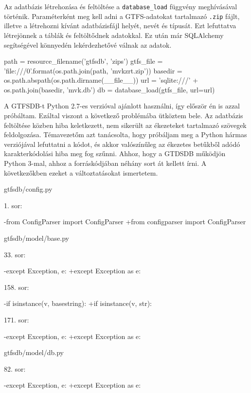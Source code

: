 Az adatbázis létrehozása és feltöltése a \texttt{database\_load} függvény meghívásával történik. Paraméterként meg kell adni a GTFS-adatokat tartalmazó \texttt{.zip} fájlt, illetve a létrehozni kívánt adatbázisfájl helyét, nevét és típusát. Ezt lefuttatva létrejönnek a táblák és feltöltődnek adatokkal. Ez után már SQLAlchemy segítségével könnyedén lekérdezhetővé válnak az adatok.

\begin{python}
path = resource_filename('gtfsdb', 'zips')
gtfs_file = 'file:///{0}'.format(os.path.join(path, 'mvkzrt.zip'))
basedir = os.path.abspath(os.path.dirname(__file__))
url = 'sqlite:///' + os.path.join(basedir, 'mvk.db')
db = database_load(gtfs_file, url=url)
\end{python}

A GTFSDB-t Python 2.7-es verzióval ajánlott használni, így először én is azzal próbáltam. Ezáltal viszont a következő problémába ütköztem bele. Az adatbázis feltöltése közben hiba keletkezett, nem sikerült az ékezeteket tartalmazó szövegek feldolgozása. Témavezetőm azt tanácsolta, hogy próbáljam meg a Python hármas verziójával lefuttatni a kódot, és akkor valószínűleg az ékezetes betűkből adódó karakterkódolási hiba meg fog szűnni. Ahhoz, hogy a GTDSDB működjön Python 3-mal, ahhoz a forráskódjában néhány sort át kellett írni. A következőkben ezeket a változtatásokat ismertetem.

gtfsdb/config.py

1. sor:
\begin{python}
-from ConfigParser import ConfigParser
+from configparser import ConfigParser
\end{python}

gtfsdb/model/base.py

33. sor:
\begin{python}
-except Exception, e:
+except Exception as e: 
\end{python}

158. sor:
\begin{python}
-if isinstance(v, basestring):
+if isinstance(v, str):
\end{python}

171. sor:
\begin{python}
-except Exception, e:
+except Exception as e:
\end{python}

gtfsdb/model/db.py

82. sor:
\begin{python}
-except Exception, e:
+except Exception as e:
\end{python}


